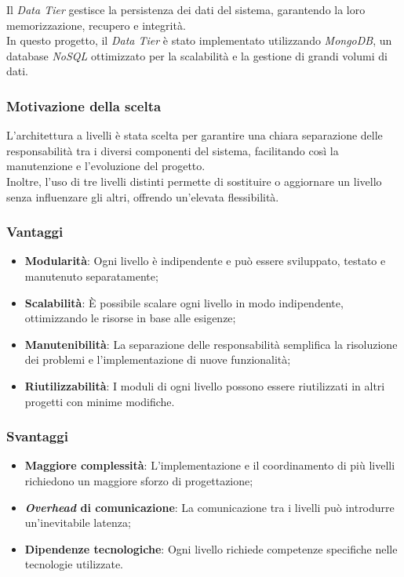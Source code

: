 \noindent Il \textit{Data Tier} gestisce la persistenza dei dati del sistema, garantendo la loro memorizzazione, recupero e integrità. \\
In questo progetto, il \textit{Data Tier} è stato implementato utilizzando \textit{MongoDB}, un database \textit{NoSQL} ottimizzato per la scalabilità e la gestione di grandi volumi di dati.

\subsubsection{Motivazione della scelta}

\noindent L'architettura a livelli è stata scelta per garantire una chiara separazione delle responsabilità tra i diversi componenti del sistema, facilitando così la manutenzione e l'evoluzione del progetto.\\
Inoltre, l'uso di tre livelli distinti permette di sostituire o aggiornare un livello senza influenzare gli altri, offrendo un'elevata flessibilità.

\subsubsection{Vantaggi}
\begin{itemize}
    \item \textbf{Modularità}: Ogni livello è indipendente e può essere sviluppato, testato e manutenuto separatamente;
    \item \textbf{Scalabilità}: È possibile scalare ogni livello in modo indipendente, ottimizzando le risorse in base alle esigenze;
    \item \textbf{Manutenibilità}: La separazione delle responsabilità semplifica la risoluzione dei problemi e l'implementazione di nuove funzionalità;
    \item \textbf{Riutilizzabilità}: I moduli di ogni livello possono essere riutilizzati in altri progetti con minime modifiche.
\end{itemize}

\subsubsection{Svantaggi}
\begin{itemize}
    \item \textbf{Maggiore complessità}: L'implementazione e il coordinamento di più livelli richiedono un maggiore sforzo di progettazione;
    \item \textbf{\textit{Overhead} di comunicazione}: La comunicazione tra i livelli può introdurre un'inevitabile latenza;
    \item \textbf{Dipendenze tecnologiche}: Ogni livello richiede competenze specifiche nelle tecnologie utilizzate.
\end{itemize}

